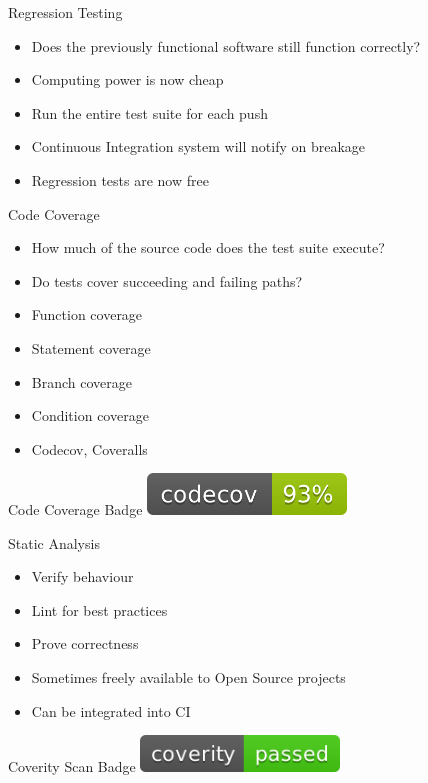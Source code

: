 \documentclass{beamer}
\begin{document}
\begin{frame}{Regression Testing}
	\begin{itemize}
		\item Does the previously functional software still function correctly?
		\item Computing power is now cheap
		\item Run the entire test suite for each push
		\item Continuous Integration system will notify on breakage
		\item Regression tests are now free
	\end{itemize}
\end{frame}

\begin{frame}{Code Coverage}
	\begin{itemize}
		\item How much of the source code does the test suite execute?
		\item Do tests cover succeeding and failing paths?
		\item Function coverage
		\item Statement coverage
		\item Branch coverage
		\item Condition coverage
		\item Codecov, Coveralls
	\end{itemize}
	\begin{block}{Code Coverage Badge}
		\includegraphics[width=200px]{codecov.png}
	\end{block}
\end{frame}

\begin{frame}{Static Analysis}
	\begin{itemize}
		\item Verify behaviour
		\item Lint for best practices
		\item Prove correctness
		\item Sometimes freely available to Open Source projects
		\item Can be integrated into CI
	\end{itemize}
	\begin{block}{Coverity Scan Badge}
		\includegraphics[width=200px]{coverity.png}
	\end{block}
\end{frame}
\end{document}
